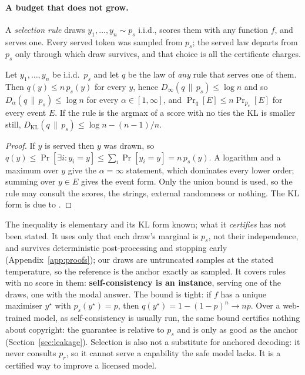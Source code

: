 \paragraph{A budget that does not grow.} A \emph{selection rule} draws $y_1,\dots,y_n \sim p_s$ i.i.d.,
scores them with any function $f$, and serves one. Every served token was sampled from $p_s$; the served
law departs from $p_s$ only through which draw survives, and that choice is all the certificate charges.

\begin{proposition}\label{prop:selection}
Let $y_1,\dots,y_n$ be i.i.d.\ $p_s$ and let $q$ be the law of \emph{any} rule that serves one of
them. Then $q(y) \le n\,p_s(y)$ for every $y$, hence
$D_\infty(q \,\|\, p_s) \le \log n$ and so $D_\alpha(q\,\|\,p_s) \le \log n$ for every
$\alpha \in [1,\infty]$, and $\Pr_q[E] \le n \Pr_{p_s}[E]$ for every event $E$. If the rule is the
argmax of a score with no ties the KL is smaller still,
$D_{\mathrm{KL}}(q \,\|\, p_s) \le \log n - (n-1)/n$.
\end{proposition}

\begin{proof}
If $y$ is served then $y$ was drawn, so
$q(y) \le \Pr[\exists i : y_i = y] \le \sum_i \Pr[y_i = y] = n\,p_s(y)$. A logarithm and a maximum
over $y$ give the $\alpha = \infty$ statement, which dominates every lower order; summing over
$y \in E$ gives the event form. Only the union bound is used, so the rule may consult the scores, the
strings, external randomness or nothing. The KL form is due to \citet{beirami2025bestofn}.
\end{proof}

The inequality is elementary and its KL form known; what it \emph{certifies} has not been stated. It
uses only that each draw's marginal is $p_s$, not their independence, and survives deterministic
post-processing and stopping early (Appendix~\ref{app:proofs}); our draws are untruncated samples at the
stated temperature, so the reference is the anchor exactly as sampled. It covers rules with no score in
them:
\textbf{self-consistency \citep{wang2023selfconsistency} is an instance}, serving one of the draws, one with the
modal answer. The bound is tight: if $f$ has a unique maximiser $y^\star$ with $p_s(y^\star) = p$, then $q(y^\star) = 1-(1-p)^n \to np$. Over a web-trained model, as
self-consistency is usually run, the same bound certifies nothing about copyright: the guarantee is
relative to $p_s$ and is only as good as the anchor (Section~\ref{sec:leakage}). Selection is also not a
substitute for anchored decoding: it never consults $p_r$, so it cannot serve a capability the safe model
lacks. It is a certified way to improve a licensed model.

